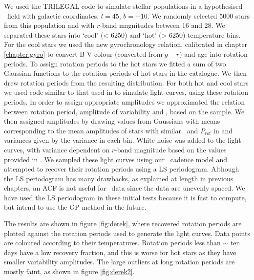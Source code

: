 We used the TRILEGAL \citep{Girardi2012} code to simulate stellar populations
in a hypothesised \LSST\ field with galactic coordinates, $l = 45$, $b = -10$.
We randomly selected 5000 stars from this population and with $r$-band
magnitudes between 16 and 28.
We separated these stars into `cool' (< 6250) and `hot' (> 6250) temperature
bins.
For the cool stars we used the new gyrochronology relation, calibrated in
chapter \ref{chapter:gyro} to convert B-V colour (converted from $g-r$) and
age into rotation periods.
To assign rotation periods to the hot stars we fitted a sum of two Gaussian
functions to the rotation periods of hot stars in the \citet{Mcquillan2014}
catalogue.
We then drew rotation periods from the resulting distribution.
For both hot and cool stars we used code similar to that used in
\citet{Aigrain2015} to simulate light curves, using these rotation periods.
In order to assign appropriate amplitudes we approximated the relation between
rotation period, amplitude of variability and \teff, based on the
\citet{Mcquillan2014} sample.
We then assigned amplitudes by drawing values from Gaussians with means
corresponding to the mean amplitudes of stars with similar \teff\ and
$P_{rot}$ in \citet{Mcquillan2014} and variances given by the variance in each
bin.
White noise was added to the light curves, with variance dependent on $r$-band
magnitude based on the values provided in \citet{Jacklin2015}.
We sampled these light curves using our \LSST\ cadence model and attempted to
recover their rotation periods using a LS periodogram.
Although the LS periodogram has many drawbacks, as explained at length in
previous chapters, an ACF is not useful for \LSST\ data since the data are
unevenly spaced.
We have used the LS periodogram in these initial tests because it is fast to
compute, but intend to use the GP method in the future.

The results are shown in figure \ref{fig:derek}, where recovered rotation
periods are plotted against the rotation periods used to generate the light
curves.
Data points are coloured according to their temperatures.
Rotation periods less than $\sim$ ten days have a low recovery fraction, and
this is worse for hot stars as they have smaller variability amplitudes.
The large outliers at long rotation periods are mostly faint, as shown in
figure \ref{fig:derek2}.

